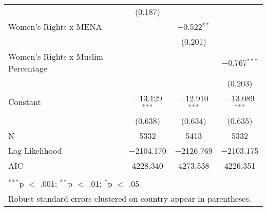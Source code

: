 \begin{table}[!htbp]
\begin{tabular}{@{\extracolsep{5pt}}lccc}
  & (0.187) &  &  \\ 
  Women's Rights x MENA &  & $-$0.522$^{**}$ &  \\ 
  &  & (0.201) &  \\ 
  Women's Rights x Muslim Percentage &  &  & $-$0.767$^{***}$ \\ 
  &  &  & (0.203) \\ 
  Constant & $-$13.129$^{***}$ & $-$12.910$^{***}$ & $-$13.089$^{***}$ \\ 
  & (0.638) & (0.634) & (0.635) \\ 
 N & 5332 & 5413 & 5332 \\ 
Log Likelihood & $-$2104.170 & $-$2126.769 & $-$2103.175 \\ 
AIC & 4228.340 & 4273.538 & 4226.351 \\ 
\hline \\[-1.8ex] 
\multicolumn{4}{l}{$^{***}$p $<$ .001; $^{**}$p $<$ .01; $^{*}$p $<$ .05} \\ 
\multicolumn{4}{l}{Robust standard errors clustered on country appear in parentheses.} \\ 
\end{tabular} 
\end{table} 
